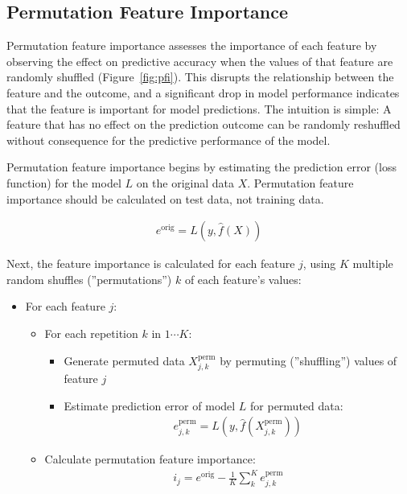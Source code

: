 \FloatBarrier
\subsection{Permutation Feature Importance}

Permutation feature importance assesses the importance of each feature by observing the effect on predictive accuracy when the values of that feature are randomly shuffled (Figure~\ref{fig:pfi}). This disrupts the relationship between the feature and the outcome, and a significant drop in model performance indicates that the feature is important for model predictions. The intuition is simple: A feature that has no effect on the prediction outcome can be randomly reshuffled without consequence for the predictive performance of the model.

Permutation feature importance begins by estimating the prediction error (loss function) for the model $L$ on the original data $X$. Permutation feature importance should be calculated on test data, not training data.

\begin{align*}
e^{\text{orig}} = L(y, \hat{f}(X))
\end{align*}

Next, the feature importance is calculated for each feature $j$, using $K$ multiple random shuffles (''permutations'') $k$ of each feature's values:

\begin{itemize}
\item For each feature $j$:
  \begin{itemize}
     \item For each repetition $k$ in $1 \cdots K$:
     \begin{itemize}
        \item Generate permuted data $X^{\text{perm}}_{j, k}$ by permuting (''shuffling'') values of feature $j$
        \item Estimate prediction error of model $L$ for permuted data:
        \begin{align*}e^{\text{perm}}_{j, k} = L(y, \hat{f}(X^{\text{perm}}_{j, k}))\end{align*}
     \end{itemize}
     \item Calculate permutation feature importance: 
     \begin{align*}i_j = e^{\text{orig}} - \frac{1}{K}\sum_k^K e^{\text{perm}}_{j, k}\end{align*}
  \end{itemize}
\end{itemize}

